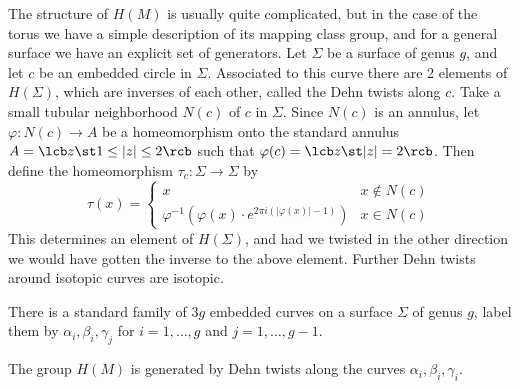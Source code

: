 The structure of $H(M)$ is usually quite complicated, but in the case of the torus we have a simple description of its mapping class group, and for a general surface we have an explicit set of generators. Let $\Sigma$ be a surface of genus $g$, and let $c$ be an embedded circle in $\Sigma$. Associated to this curve there are 2 elements of $H(\Sigma)$, which are inverses of each other, called  the Dehn twists along $c$. Take a small tubular neighborhood $N(c)$ of $c$ in $\Sigma$. Since $N(c)$ is an annulus, let $\varphi : N(c) \rightarrow A$ be a homeomorphism onto the standard annulus $A = \lcb z \st 1 \leq |z| \leq 2 \rcb$ such that $\varphi(c) = \lcb z \st |z|=2 \rcb$. Then define the homeomorphism $\tau_c : \Sigma \rightarrow \Sigma$ by
\[ \tau(x) = \begin{cases} x & x \notin N(c) \\ \varphi^{-1}\left( \varphi(x) \cdot e^{2\pi i (|\varphi(x)|-1)} \right) & x \in N(c) \end{cases} \]
This determines an element of $H(\Sigma)$, and had we twisted in the other direction we would have gotten the inverse to the above element. Further Dehn twists around isotopic curves are isotopic.

There is a standard family of $3g$ embedded curves on a surface $\Sigma$ of genus $g$, label them by $\alpha_i,\beta_i,\gamma_j$ for $i=1,\ldots,g$ and $j=1,\ldots,g-1$. 
\begin{thm}
\label{Dehn-Lickorish Theorem}
The group $H(M)$ is generated by Dehn twists along the curves $\alpha_i,\beta_i,\gamma_i$.
\end{thm}


